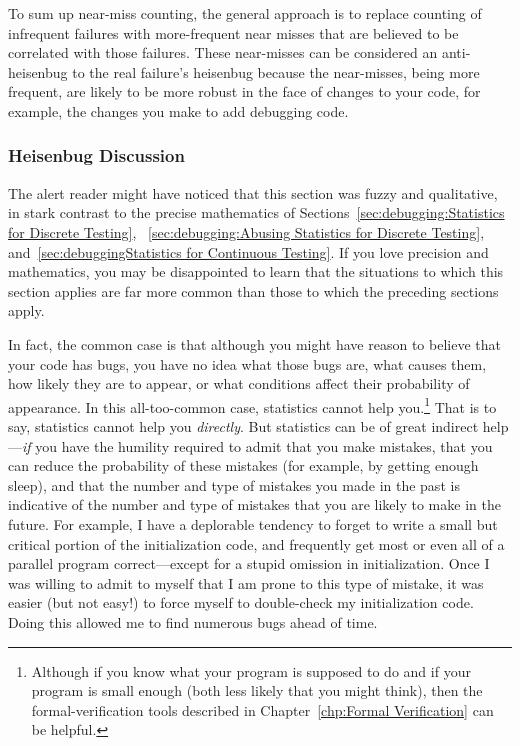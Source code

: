 To sum up near-miss counting, the general approach is to replace counting
of infrequent failures with more-frequent near misses that are believed
to be correlated with those failures.
These near-misses can be considered an anti-heisenbug to the real failure's
heisenbug because the near-misses, being more frequent, are likely to
be more robust in the face of changes to your code, for example, the
changes you make to add debugging code.

\subsubsection{Heisenbug Discussion}
\label{sec:debugging:Heisenbug Discussion}

The alert reader might have noticed that this section was fuzzy and
qualitative, in stark contrast to the precise mathematics of
Sections~\ref{sec:debugging:Statistics for Discrete Testing},
~\ref{sec:debugging:Abusing Statistics for Discrete Testing},
and~\ref{sec:debuggingStatistics for Continuous Testing}.
If you love precision and mathematics, you may be disappointed to
learn that the situations to which this section applies are far
more common than those to which the preceding sections apply.

In fact, the common case is that although you might have reason to believe
that your code has bugs, you have no idea what those bugs are, what
causes them, how likely they are to appear, or what conditions affect
their probability of appearance.
In this all-too-common case, statistics cannot help you.\footnote{
	Although if you know what your program is supposed to do and
	if your program is small enough (both less likely that you
	might think), then the formal-verification tools described in
	Chapter~\ref{chp:Formal Verification}
	can be helpful.}
That is to say, statistics cannot help you \emph{directly}.
But statistics can be of great indirect help---\emph{if} you have the
humility required to admit that you make mistakes, that you can reduce the
probability of these mistakes (for example, by getting enough sleep), and
that the number and type of mistakes you made in the past is indicative of
the number and type of mistakes that you are likely to make in the future.
For example, I have a deplorable tendency to forget to write a small
but critical portion of the initialization code, and frequently get most
or even all of a parallel program correct---except for a stupid
omission in initialization.
Once I was willing to admit to myself that I am prone to this type of
mistake, it was easier (but not easy!) to force myself to double-check
my initialization code.
Doing this allowed me to find numerous bugs ahead of time.

